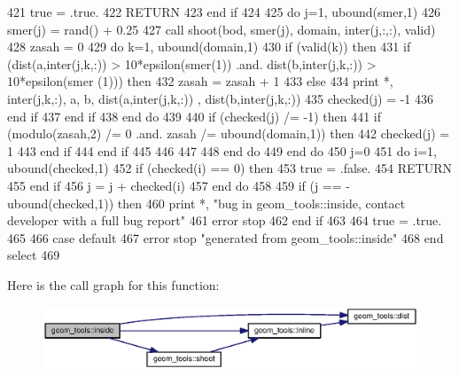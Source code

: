 \begin{DoxyCode}
421             true = .true.
422             \textcolor{keywordflow}{RETURN}
423 \textcolor{keywordflow}{          end if}
424 
425           \textcolor{keywordflow}{do} j=1, ubound(smer,1)
426             smer(j) = rand() + 0.25
427             \textcolor{keyword}{call }shoot(bod, smer(j), domain,  inter(j,:,:), valid)
428             zasah = 0
429             \textcolor{keywordflow}{do} k=1, ubound(domain,1)
430               \textcolor{keywordflow}{if} (valid(k)) \textcolor{keywordflow}{then}
431                 \textcolor{keywordflow}{if} (dist(a,inter(j,k,:)) > 10*epsilon(smer(1)) .and. dist(b,inter(j,k,:)) > 10*epsilon(smer
      (1))) \textcolor{keywordflow}{then}
432                   zasah = zasah + 1
433                 \textcolor{keywordflow}{else}
434                   print *, inter(j,k,:), a, b, dist(a,inter(j,k,:)) , dist(b,inter(j,k,:))
435                   checked(j) = -1
436 \textcolor{keywordflow}{                end if}
437 \textcolor{keywordflow}{              end if}
438 \textcolor{keywordflow}{            end do}
439             
440             \textcolor{keywordflow}{if} (checked(j) /= -1) \textcolor{keywordflow}{then}
441               \textcolor{keywordflow}{if} (modulo(zasah,2) /= 0 .and. zasah /= ubound(domain,1)) \textcolor{keywordflow}{then}
442                 checked(j) = 1
443 \textcolor{keywordflow}{              end if}
444 \textcolor{keywordflow}{            end if}
445                   
446 
447               
448 \textcolor{keywordflow}{          end do}
449 \textcolor{keywordflow}{        end do}
450         j=0
451         \textcolor{keywordflow}{do} i=1, ubound(checked,1) 
452           \textcolor{keywordflow}{if} (checked(i) == 0) \textcolor{keywordflow}{then}
453             true = .false.
454             \textcolor{keywordflow}{RETURN}
455 \textcolor{keywordflow}{          end if}
456           j = j + checked(i)
457 \textcolor{keywordflow}{        end do}
458         
459         \textcolor{keywordflow}{if} (j == -ubound(checked,1)) \textcolor{keywordflow}{then}
460           print *, \textcolor{stringliteral}{"bug in geom\_tools::inside, contact developer with a full bug report"}
461           error stop
462 \textcolor{keywordflow}{        end if}
463         
464         true = .true.
465       
466 \textcolor{keywordflow}{      case default}
467         error stop \textcolor{stringliteral}{"generated from geom\_tools::inside"}
468 \textcolor{keywordflow}{    end select}
469 
\end{DoxyCode}


Here is the call graph for this function\+:\nopagebreak
\begin{figure}[H]
\begin{center}
\leavevmode
\includegraphics[width=350pt]{namespacegeom__tools_ad0cfc5aedee571cb83174e83f5d30606_cgraph}
\end{center}
\end{figure}




